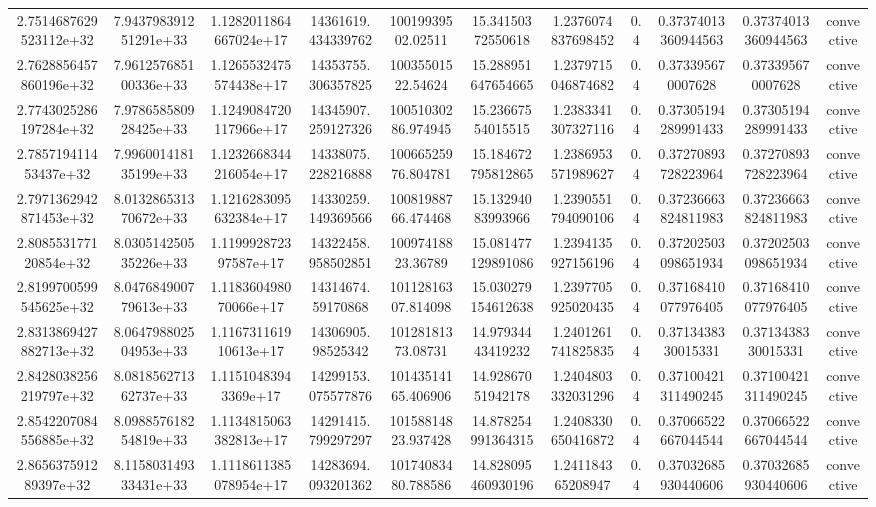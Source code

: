 \begin{table}
\begin{tabular}{ccccccccccc}
2.7514687629523112e+32 & 7.943798391251291e+33 & 1.1282011864667024e+17 & 14361619.434339762 & 10019939502.02511 & 15.34150372550618 & 1.2376074837698452 & 0.4 & 0.37374013360944563 & 0.37374013360944563 & convective \\
2.7628856457860196e+32 & 7.961257685100336e+33 & 1.1265532475574438e+17 & 14353755.306357825 & 10035501522.54624 & 15.288951647654665 & 1.2379715046874682 & 0.4 & 0.373395670007628 & 0.373395670007628 & convective \\
2.7743025286197284e+32 & 7.978658580928425e+33 & 1.1249084720117966e+17 & 14345907.259127326 & 10051030286.974945 & 15.23667554015515 & 1.2383341307327116 & 0.4 & 0.37305194289991433 & 0.37305194289991433 & convective \\
2.785719411453437e+32 & 7.996001418135199e+33 & 1.1232668344216054e+17 & 14338075.228216888 & 10066525976.804781 & 15.184672795812865 & 1.2386953571989627 & 0.4 & 0.37270893728223964 & 0.37270893728223964 & convective \\
2.7971362942871453e+32 & 8.013286531370672e+33 & 1.1216283095632384e+17 & 14330259.149369566 & 10081988766.474468 & 15.13294083993966 & 1.2390551794090106 & 0.4 & 0.37236663824811983 & 0.37236663824811983 & convective \\
2.808553177120854e+32 & 8.030514250535226e+33 & 1.119992872397587e+17 & 14322458.958502851 & 10097418823.36789 & 15.081477129891086 & 1.2394135927156196 & 0.4 & 0.37202503098651934 & 0.37202503098651934 & convective \\
2.8199700599545625e+32 & 8.047684900779613e+33 & 1.118360498070066e+17 & 14314674.59170868 & 10112816307.814098 & 15.030279154612638 & 1.2397705925020435 & 0.4 & 0.37168410077976405 & 0.37168410077976405 & convective \\
2.8313869427882713e+32 & 8.064798802504953e+33 & 1.116731161910613e+17 & 14306905.98525342 & 10128181373.08731 & 14.97934443419232 & 1.2401261741825835 & 0.4 & 0.3713438330015331 & 0.3713438330015331 & convective \\
2.8428038256219797e+32 & 8.081856271362737e+33 & 1.11510483943369e+17 & 14299153.075577876 & 10143514165.406906 & 14.92867051942178 & 1.2404803332031296 & 0.4 & 0.37100421311490245 & 0.37100421311490245 & convective \\
2.8542207084556885e+32 & 8.098857618254819e+33 & 1.1134815063382813e+17 & 14291415.799297297 & 10158814823.937428 & 14.878254991364315 & 1.2408330650416872 & 0.4 & 0.37066522667044544 & 0.37066522667044544 & convective \\
2.865637591289397e+32 & 8.115803149333431e+33 & 1.1118611385078954e+17 & 14283694.093201362 & 10174083480.788586 & 14.828095460930196 & 1.241184365208947 & 0.4 & 0.37032685930440606 & 0.37032685930440606 & convective \\

\end{tabular}
\end{table}
